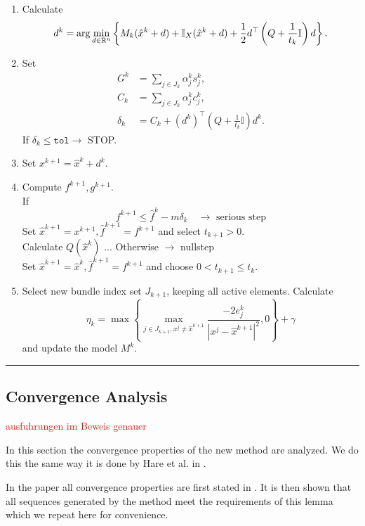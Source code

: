 \begin{enumerate}
	\item Calculate \[d^k = \arg \min_{d \in \mathbb{R}^n} \left\{ M_k(\hat{x}^k+d)+\mathbb{I}_X(\hat{x}^k+d)+\frac{1}{2}d^{\top}\left(Q+\frac{1}{t_k}\mathbb{I}\right)d\right\}.\]
	\item Set %
		\begin{align*} 
		  G^k &= \sum_{j \in J_k}{\alpha_j^k s_j^k}, \\ %
			C_k &= \sum_{j \in J_k}{\alpha_j^k c_j^k}, \\
	    \delta_k &=  C_k + (d^k)^{\top}\left(Q+\frac{1}{t_k}\mathbb{I}\right)d^k.
		\end{align*}
		If \(\delta_k \leq \mathtt{tol} \rightarrow \) STOP.
	\item Set \( x^{k+1} = \hat{x}^k + d^k \).
	\item Compute \(f^{k+1}, g^{k+1}\). \\
	If 
	\[f^{k+1} \leq \hat{f}^k - m\delta_k \quad \rightarrow \text{ serious step} \]
	Set \(\hat{x}^{k+1} = x^{k+1}, \hat{f}^{k+1} = f^{k+1}\) and select \(t_{k+1} > 0\). \\
	Calculate \(Q(\hat{x}^k)\) ...
	Otherwise \(\rightarrow\) nullstep \\
	Set \(\hat{x}^{k+1} = \hat{x}^k, \hat{f}^{k+1}=f^{k+1}\) and choose \(0 < t_{k+1} \leq t_k\). 	
	\item Select new bundle index set \(J_{k+1}\), keeping all active elements. Calculate 
	\[ \eta_k = \max{\left\{\max_{j \in J_{k+1}, x^j \neq \hat{x}^{k+1}}{\frac{-2e_j^k}{|x^j - \hat{x}^{k+1}|^2}, 0}\right\}}+\gamma  \]
	and update the model \(M^k\).
\end{enumerate}
\vspace{1ex}
\hrule

\vspace{1.5em}

\subsection{Convergence Analysis}

\textcolor{red}{ausfuhrungen im Beweis genauer}

In this section the convergence properties of the new method are analyzed. We do this the same way it is done by Hare et al. in \cite{Hare2016}.

In the paper all convergence properties are first stated in \cite[Lemma 5]{Hare2016}. It is then shown that all sequences generated by the method meet the requirements of this lemma which we repeat here for convenience.

